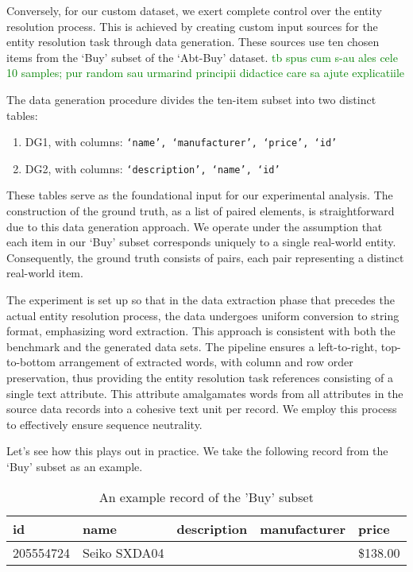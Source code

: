 Conversely, for our custom dataset, we exert complete control over the
entity resolution process.
This is achieved by creating custom input sources for the entity resolution
task through data generation.
These sources use ten chosen items from the `Buy' subset of the
`Abt-Buy' dataset. 
\textcolor{green}{tb spus cum s-au ales cele 10 samples; pur random sau urmarind principii didactice care sa ajute explicatiile}

The data generation procedure divides the ten-item subset into two distinct
tables:

\begin{enumerate}[label=\textbullet,leftmargin=1cm]
\item DG1, with columns: \texttt{`name', `manufacturer', `price', `id'}
\item DG2, with columns: \texttt{`description', `name', `id'}
\end{enumerate}

These tables serve as the foundational input for our experimental analysis.
The construction of the ground truth, as a list of paired elements, is
straightforward due to this data generation approach.
We operate under the assumption that each item in our `Buy' subset
corresponds uniquely to a single real-world entity.
Consequently, the ground truth consists of pairs, each pair representing a
distinct real-world item.

The experiment is set up so that in the data extraction phase that precedes the
actual entity resolution process, the data undergoes uniform conversion to
string format, emphasizing word extraction.
This approach is consistent with both the benchmark and the generated data sets.
The pipeline ensures a left-to-right, top-to-bottom arrangement of extracted
words, with column and row order preservation, thus providing the entity
resolution task references consisting of a single text attribute.
This attribute amalgamates words from all attributes in the source data records
into a cohesive text unit per record.
We employ this process to effectively ensure sequence neutrality.

Let's see how this plays out in practice.
We take the following record from the `Buy' subset as an example.

\begin{table}[ht]
    \setlength\tabcolsep{5pt}
    \begin{tabular}{|l|l|l|l|l|}
        \hline
        id&name&description&manufacturer&price\\
        \hline
        205554724&Seiko SXDA04& & &\$138.00\\
        \hline
    \end{tabular}
    \label{tab:buy-record}
    \caption{An example record of the 'Buy' subset}
\end{table}

